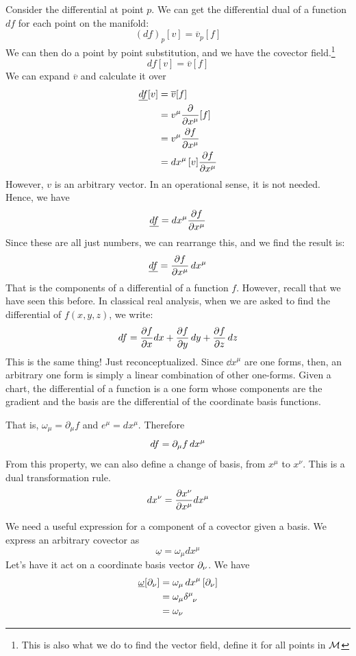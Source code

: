 		Consider the differential at point $p$. 
		We can get the differential dual of a function $df$ for each point 
		on the manifold:
		\[
			(\underline{df})_p [v] = \overline{v}_p[f]
		\]
		We can then do a point by point substitution, and we have the covector field.\footnote{This 
		is also what we do to find the vector field, define it for all points in $\mathcal M$}
		\[
			\underline{df}[v] = \overline{v}[f]
		\]
		We can expand $\overline v$ and calculate it over
		\begin{align*}
			\underline{df}[v] &= \overline{v}[f]\\
							  &= v^\mu \pdv{}{x^\mu}[f]\\
							  &= v^\mu \pdv{f}{x^\mu} \\
							  &= \dd{x^\mu}[v] \pdv{f}{x^\mu}
		\end{align*}
		However, $v$ is an arbitrary vector. In an operational sense, it is not needed. Hence, we have
		\[
			\underline{df} = dx^\mu \pdv{f}{x^\mu} 
		\]
		Since these are all just numbers, we can rearrange this, and we find the result is:
		\begin{equation}
			\label{eq:df-basis}
			\underline{\dd{f}} = \pdv{f}{x^\mu} \dd{x^\mu} 
		\end{equation}
		That is the components of a differential of a function $f$. However, recall that we 
		have seen this before. In classical real analysis, when we are asked to find the differential
		of $f(x,y,z)$, we write:
		\[
			df = \pdv{f}{x}dx + \pdv{f}{y}\dd{y} + \pdv{f}{z}\dd{z}  
		\]
		This is the same thing! Just reconceptualized. Since $\dd{x^\mu}$ are one forms, then,
		an arbitrary one form is simply a linear combination of other one-forms. 
		Given a chart, the differential of 
		a function is a one form whose components are the gradient and the basis are the differential
		of the coordinate basis functions. 

		That is, $\omega_\mu = \partial_\mu f$ and $e^\mu = dx^\mu$. Therefore
		\[
			df = \partial_\mu f \dd{x^\mu}
		\]
		From this property, we can also define a change of basis, from $x^\mu$ to $x^\nu$. This is a dual transformation rule.
		\begin{equation}
			\label{eq:dual-change-basis}
		    dx^\nu = \pdv{x^\nu}{x^\mu} dx^\mu 
		\end{equation}
		
		We need a useful expression for a component of a covector given a basis. 
		We express an arbitrary covector as 
		\[
			\underline\omega = \omega_\mu dx^\mu
		\]
		Let's have it act on a coordinate basis vector $\partial_\nu$. We have
		\begin{align*}
			\underline\omega[\p_\nu] 
			&= \omega_\mu \dd{x}^\mu[\p_\nu]\\
			&= \omega_\mu \tensor{\delta}{^\mu_\nu}\\
			&= \omega_\nu
		\end{align*}

